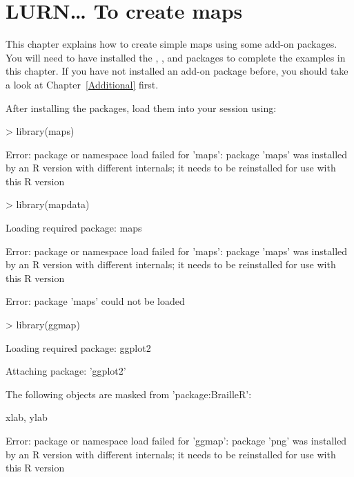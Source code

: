 



\chapter{LURN\ldots{} To create maps} 
\label{Maps} 
 



 
This chapter explains how to create simple maps using some add-on packages. You will need to have installed the , , and   packages to complete the examples in this chapter. If you have not installed an add-on package before, you should take a look at Chapter~\ref{Additional} first. 
 
After installing the packages, load them into your \R{} session using: 

\begin{Schunk}
\begin{Sinput}
> library(maps) 
\end{Sinput}
\begin{Soutput}
Error: package or namespace load failed for 'maps':
 package 'maps' was installed by an R version with different internals; it needs to be reinstalled for use with this R version
\end{Soutput}
\begin{Sinput}
> library(mapdata) 
\end{Sinput}
\begin{Soutput}
Loading required package: maps
\end{Soutput}
\begin{Soutput}
Error: package or namespace load failed for 'maps':
 package 'maps' was installed by an R version with different internals; it needs to be reinstalled for use with this R version
\end{Soutput}
\begin{Soutput}
Error: package 'maps' could not be loaded
\end{Soutput}
\begin{Sinput}
> library(ggmap) 
\end{Sinput}
\begin{Soutput}
Loading required package: ggplot2
\end{Soutput}
\begin{Soutput}

Attaching package: 'ggplot2'
\end{Soutput}
\begin{Soutput}
The following objects are masked from 'package:BrailleR':

    xlab, ylab
\end{Soutput}
\begin{Soutput}
Error: package or namespace load failed for 'ggmap':
 package 'png' was installed by an R version with different internals; it needs to be reinstalled for use with this R version
\end{Soutput}
\end{Schunk}

